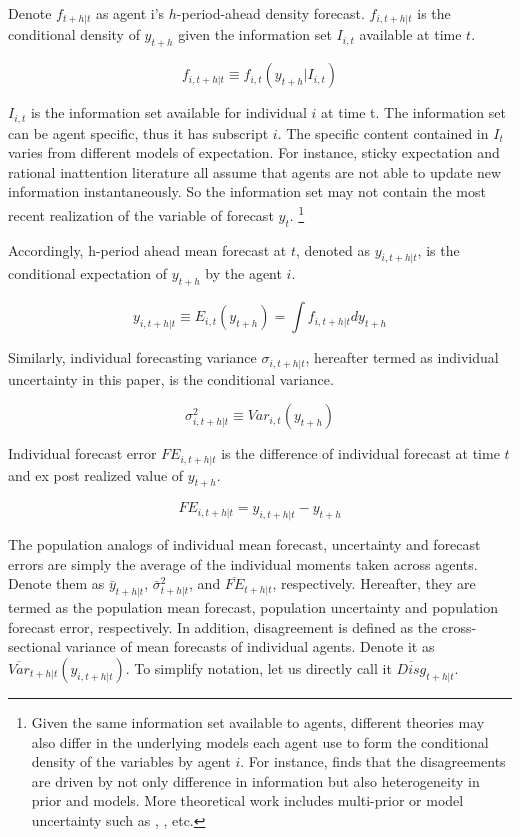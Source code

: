 \documentclass[12pt]{article}
\begin{document}
	Denote $ f_{t+h|t}$ as agent i's $h$-period-ahead density forecast. $ f_{i,t+h|t}$ is the conditional density of $y_{t+h}$ given the information set $I_{i,t}$ available at time $t$. 
	
	$$f_{i,t+h|t} \equiv f_{i,t}(y_{t+h}|I_{i,t})$$
	
	
	$I_{i,t}$ is the information set available for individual $i$ at time t. The information set can be  agent specific, thus it has subscript $i$.  The specific content contained in $I_t$ varies from different models of expectation. For instance, sticky expectation and rational inattention literature all assume that agents are not able to update new information instantaneously. So the information set may not contain the most recent realization of the variable of forecast $y_t$. \footnote{Given the same information set available to agents, different theories may also differ in the underlying models each agent use to form the conditional density of the variables by agent $i$. For instance, \citet{patton2010forecasters} finds that the disagreements are driven by not only difference in information but also heterogeneity in prior and models. More theoretical work includes multi-prior or model uncertainty such as \citet{hansen2001robust}, \citet{hansen2008robustness}, etc.}
	
	Accordingly, h-period ahead mean forecast at $t$, denoted as $ y_{i,t+h|t}$, is the conditional expectation of $y_{t+h}$ by the agent $i$. 
	
	$$y_{i,t+h|t} \equiv E_{i,t}(y_{t+h}) =\int f_{i, t+h|t} d y_{t+h}$$
	
	Similarly, individual forecasting variance $\sigma_{i,t+h|t}$, hereafter termed as individual uncertainty in this paper, is the conditional variance.
	
	$$\sigma^2_{i,t+h|t} \equiv Var_{i,t}( y_{t+h} )$$
	
	Individual forecast error $FE_{i,t+h|t}$ is the difference of individual forecast at time $t$ and ex post realized value of $y_{t+h}$.  
	
	$$FE_{i,t+h|t} = y_{i,t+h|t} - y_{t+h}$$
	
	The population analogs of individual mean forecast, uncertainty and forecast errors are simply the average of the individual moments taken across agents. Denote them as $\bar y_{t+h|t}$, $\bar \sigma^2_{t+h|t}$, and $\overline{FE}_{t+h|t}$, respectively. Hereafter, they are termed as the population mean forecast, population uncertainty and population forecast error, respectively. In addition, disagreement is defined as the cross-sectional variance of mean forecasts of individual agents.  Denote it as $\overline{Var}_{t+h|t}(y_{i,t+h|t}) $. To simplify notation, let us directly call it $\overline{Disg}_{t+h|t}$.  
	
\end{document}
